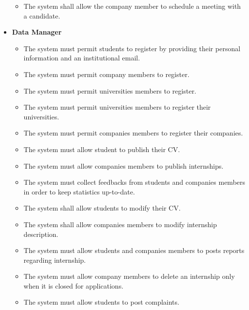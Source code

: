 \begin{itemize}
    \begin{itemize}
        \item [\text{ [R17] }] The system shall allow the company member to schedule a meeting with a candidate.\\
    \end{itemize}
    \item \textbf{Data Manager}
    \begin{itemize}
        \item [\text{ [R1] }] The system must permit students to register by providing their personal information and an institutional email.
        \item [\text{ [R2] }] The system must permit company members to register.
        \item [\text{ [R3] }] The system must permit universities members to register.
        \item [\text{ [R4] }] The system must permit universities members to register their universities.
        \item [\text{ [R5] }] The system must permit companies members to register their companies.
        \item [\text{ [R7] }] The system must allow student to publish their CV.
        \item [\text{ [R8] }] The system must allow companies members to publish internships.
        \item [\text{ [R15] }] The system must collect feedbacks from students and companies members in order to keep statistics up-to-date.
        \item [\text{ [R23] }] The system shall allow students to modify their CV.
        \item [\text{ [R24] }] The system shall allow companies members to modify internship description.
        \item [\text{ [R26] }] The system must allow students and companies members to posts reports regarding internship.
        \item [\text{ [R33] }] The system must allow company members to delete an internship only when it is closed for applications.
        \item [\text{ [R35] }] The system must allow students to post complaints.
    \end{itemize}
\end{itemize}

